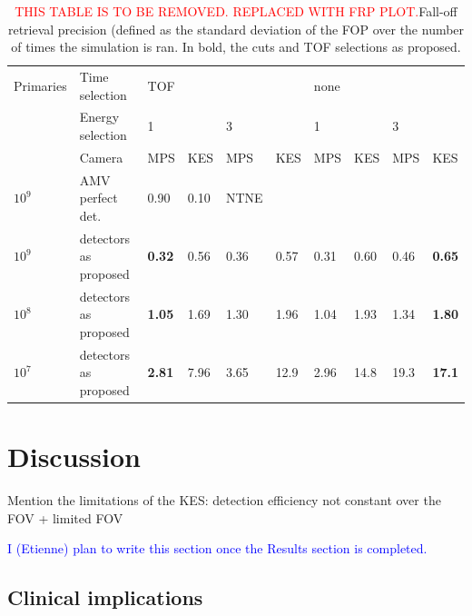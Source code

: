 \documentclass[a4paper,english,12pt]{article}
\newcommand{\bh}[2][red]{\textcolor{#1}{#2}}
\newcommand{\et}[2][blue]{\textcolor{#1}{#2}}
\begin{document}
\begin{table}[h]
\centering
\begin{tabular}{llllllllll}
	\midrule
	Primaries & Time selection 					& TOF &     &     &     & none&     &     &     \\
	          & Energy selection 				& 1   &     & 3   &     & 1   &     & 3   &     \\
	          & Camera 							& MPS & KES & MPS & KES & MPS & KES & MPS & KES \\
	\midrule
 	$10^9$    & AMV perfect det.        & 0.90 & 0.10 & NTNE\\
	\midrule
 	$10^9$    & detectors as proposed     & \textbf{0.32} & 0.56 & 0.36 & 0.57 & 0.31 & 0.60 & 0.46 & \textbf{0.65} \\
 	$10^8$    & detectors as proposed     & \textbf{1.05} & 1.69 & 1.30 & 1.96 & 1.04 & 1.93 & 1.34 & \textbf{1.80} \\
 	$10^7$    & detectors as proposed     & \textbf{2.81} & 7.96 & 3.65 & 12.9 & 2.96 & 14.8 & 19.3 & \textbf{17.1} \\
	\midrule
\end{tabular}
\caption{\bh{THIS TABLE IS TO BE REMOVED. REPLACED WITH FRP PLOT.}Fall-off retrieval precision (defined as the standard deviation of the FOP over the number of times the simulation is ran. In bold, the cuts and TOF selections as proposed.}
\label{FRPCOMP}
\end{table}

\section{Discussion}

Mention the limitations of the KES: detection efficiency not constant over the FOV + limited FOV

\et{I (Etienne) plan to write this section once the Results section is completed.}


\subsection{Clinical implications}
\end{document}
